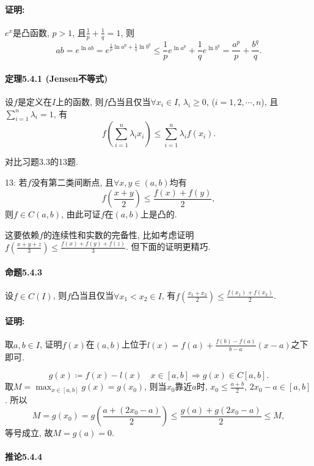 \paragraph{证明:}

$e^{x}$是凸函数, $p>1$, 且$\frac{1}{p}+\frac{1}{q}=1$, 则
\[
ab=e^{\ln ab}=e^{\frac{1}{p}\ln a^{p}+\frac{1}{q}\ln b^{q}}\le\frac{1}{p}e^{\ln a^{p}}+\frac{1}{q}e^{\ln b^{q}}=\frac{a^{p}}{p}+\frac{b^{q}}{q}.
\]


\paragraph{定理5.4.1 (Jensen不等式)}

设$f$是定义在$I$上的函数, 则$f$凸当且仅当$\forall x_{i}\in I$, $\lambda_{i}\ge0$,
($i=1,2,\cdots,n$), 且$\sum_{i=1}^{n}\lambda_{i}=1$, 有
\[
f\left(\sum_{i=1}^{n}\lambda_{i}x_{i}\right)\le\sum_{i=1}^{n}\lambda_{i}f(x_{i}).
\]

对比习题3.3的13题.

13: 若$f$没有第二类间断点, 且$\forall x,y\in(a,b)$均有
\[
f\left(\frac{x+y}{2}\right)\le\frac{f(x)+f(y)}{2},
\]
则$f\in C(a,b)$, 由此可证$f$在$(a,b)$上是凸的.

这要依赖$f$的连续性和实数的完备性, 比如考虑证明$f\left(\frac{x+y+z}{3}\right)\le\frac{f(x)+f(y)+f(z)}{3}$.
但下面的证明更精巧.

\paragraph{命题5.4.3}

设$f\in C(I)$, 则$f$凸当且仅当$\forall x_{1}<x_{2}\in I$, 有$f\left(\frac{x_{1}+x_{2}}{2}\right)\le\frac{f(x_{1})+f(x_{2})}{2}$.

\paragraph{证明:}

取$a,b\in I$, 证明$f(x)$在$(a,b)$上位于$l(x)=f(a)+\frac{f(b)-f(a)}{b-a}(x-a)$之下即可.

\[
g(x)\coloneqq f(x)-l(x)\quad x\in[a,b]\Longrightarrow g(x)\in C[a,b].
\]
取$M=\max_{x\in[a,b]}g(x)=g(x_{0})$, 则当$x_{0}$靠近$a$时, $x_{0}\le\frac{a+b}{2}$,
$2x_{0}-a\in[a,b]$. 所以
\[
M=g(x_{0})=g\left(\frac{a+(2x_{0}-a)}{2}\right)\le\frac{g(a)+g(2x_{0}-a)}{2}\le M,
\]
等号成立, 故$M=g(a)=0$.

\paragraph{推论5.4.4}

